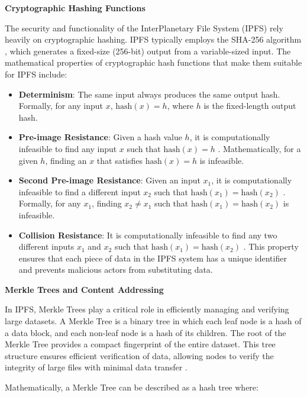 \documentclass[final]{rc-book-2.14}
\begin{document}
\textbf{Cryptographic Hashing Functions}

The security and functionality of the InterPlanetary File System (IPFS) rely heavily on cryptographic hashing. IPFS typically employs the SHA-256 algorithm \cite{menezes1996handbook}, which generates a fixed-size (256-bit) output from a variable-sized input. The mathematical properties of cryptographic hash functions that make them suitable for IPFS include:

\begin{itemize}
    \item \textbf{Determinism}: The same input always produces the same output hash. Formally, for any input $x$, $\text{hash}(x) = h$, where $h$ is the fixed-length output hash.
    \item \textbf{Pre-image Resistance}: Given a hash value $h$, it is computationally infeasible to find any input $x$ such that $\text{hash}(x) = h$ \cite{nakamoto2008bitcoin}. Mathematically, for a given $h$, finding an $x$ that satisfies $\text{hash}(x) = h$ is infeasible.
    \item \textbf{Second Pre-image Resistance}: Given an input $x_1$, it is computationally infeasible to find a different input $x_2$ such that $\text{hash}(x_1) = \text{hash}(x_2)$ \cite{menezes1996handbook}. Formally, for any $x_1$, finding $x_2 \neq x_1$ such that $\text{hash}(x_1) = \text{hash}(x_2)$ is infeasible.
    \item \textbf{Collision Resistance}: It is computationally infeasible to find any two different inputs $x_1$ and $x_2$ such that $\text{hash}(x_1) = \text{hash}(x_2)$ \cite{nist2012fips}. This property ensures that each piece of data in the IPFS system has a unique identifier and prevents malicious actors from substituting data.
\end{itemize}

\textbf{Merkle Trees and Content Addressing}

In IPFS, Merkle Trees play a critical role in efficiently managing and verifying large datasets. A Merkle Tree is a binary tree in which each leaf node is a hash of a data block, and each non-leaf node is a hash of its children. The root of the Merkle Tree provides a compact fingerprint of the entire dataset. This tree structure ensures efficient verification of data, allowing nodes to verify the integrity of large files with minimal data transfer \cite{merkle1989hash}.

Mathematically, a Merkle Tree can be described as a hash tree where:
\end{document}
